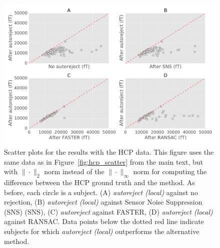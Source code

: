 \begin{figure}[htb]
	\centering
	\includegraphics[width=0.8\linewidth]{figures/figure4_supp.pdf}
    \caption[Scatter plots for the results with the HCP data with $l2$ norm instead of $l_\infty$ norm]{Scatter plots for the results with the HCP data. This figure uses the same data as in Figure~\ref{fig:hcp_scatter} from the main text, but with  $\|\cdot\|_2$ norm instead of the $\|\cdot\|_\infty$ norm for computing the difference between the HCP ground truth and the method. As before, each circle is a subject. (A) \textit{autoreject (local)} against no rejection, (B) \textit{autoreject (local)} against Sensor Noise Suppression (SNS) (SNS), (C) \textit{autoreject} against FASTER, (D) \textit{autoreject (local)} against RANSAC. Data points below the dotted red line indicate subjects for which \textit{autoreject (local)} outperforms the alternative method.}
    \label{fig:l2_norm}
\end{figure}

%
%
%

%
%
%
%
%

%
%

%

%
%
%
%
%
%
%
%
%

%
%
%
%

%
%
%
%

%

%

%
%
%
%
%
%
%

%

%
%

%
%
%

%
